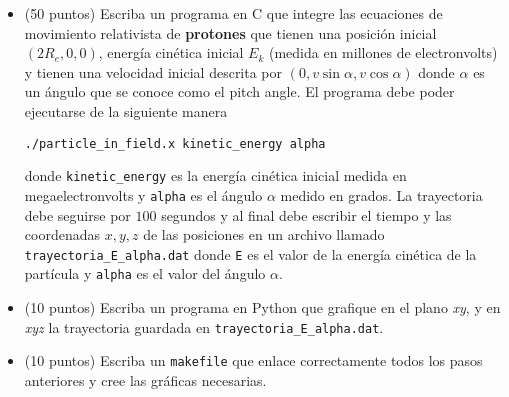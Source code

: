 \documentclass{article}
\begin{document}
\begin{enumerate}
\begin{itemize}
\item (50 puntos) Escriba un programa en C que integre las ecuaciones
  de movimiento relativista de {\bf protones} que tienen una
  posici\'on inicial $(2R_e,0,0)$, energ\'ia cin\'etica inicial
  $E_{k}$ (medida en millones de electronvolts) y tienen una velocidad
  inicial descrita por $(0,v\sin\alpha, v\cos\alpha)$ donde $\alpha$
  es un \'angulo que se conoce como el pitch angle. El programa debe
  poder ejecutarse de la siguiente manera 
\begin{verbatim}
./particle_in_field.x kinetic_energy alpha
\end{verbatim}
donde \verb"kinetic_energy" es la energ\'ia cin\'etica inicial medida
en megaelectronvolts y \verb"alpha" es el \'angulo $\alpha$ medido en
grados. La trayectoria debe seguirse por $100$ segundos y al final
debe escribir el tiempo y las coordenadas $x,y,z$ de las posiciones en un archivo
llamado \verb"trayectoria_E_alpha.dat" donde \verb"E" es el valor de la
energ\'ia cin\'etica de la part\'icula y \verb"alpha" es el valor del
\'angulo $\alpha$.

\item (10 puntos) Escriba un programa en Python que grafique en el
  plano {\it xy}, y en {\it xyz} la trayectoria guardada en
  \verb"trayectoria_E_alpha.dat".

\item (10 puntos) Escriba un \verb"makefile" que enlace correctamente
  todos los pasos anteriores y cree las gr\'aficas necesarias.
\end{itemize}


\end{enumerate}
\end{document}
